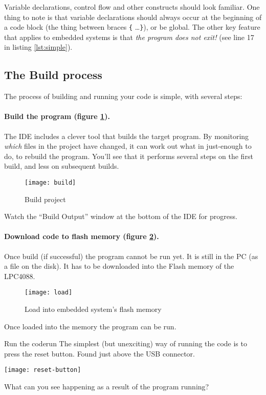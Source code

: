 \documentclass[a4paper]{tufte-handout}
\begin{document}
Variable declarations, control flow and other constructs should look
familiar.  One thing to note is that variable declarations should
always occur at the beginning of a code block (the thing between
braces \texttt{\{} \ldots \texttt{\}}), or be global.  The other key
feature that applies to embedded systems is that \emph{the program
  does not exit!} (see line 17 in listing \ref{lst:simple}).

\subsection{The Build process}
The process of building and running your code is simple, with several steps:
\paragraph{Build the program (figure \ref{fig:build}).}  The IDE includes a clever tool that
builds the target program.  By monitoring \emph{which} files in the
project have changed, it can work out what in just-enough to do, to
rebuild the program.  You'll see that it performs several steps on the
first build, and less on subsequent builds.
  \begin{figure}
    \flushright
    \texttt{[image: build]}
    \caption{Build project}
    \label{fig:build}
  \end{figure}
\begin{tcolorbox}[colframe=red!50!black]
Watch the ``Build Output'' window at the bottom of the IDE for progress.
\end{tcolorbox}
\clearpage
\paragraph{Download code to flash memory (figure \ref{fig:load}).}  Once build (if successful)
the program cannot be run yet.  It is still in the PC (as a file on
the disk).   It has to be downloaded into the
Flash memory of the LPC4088.
  \begin{figure}
    \flushright
    \texttt{[image: load]}
    \caption{Load into embedded system's flash memory}
    \label{fig:load}
  \end{figure}
Once loaded into the memory the program can be run.

\begin{exercise}{Run the code}{run}
  The simplest (but unexciting) way of running the code is to press
  the reset button.  Found just above the USB connector.

  \texttt{[image: reset-button]}

  What can you see happening as a result of the program running?
\end{exercise}
\end{document}
